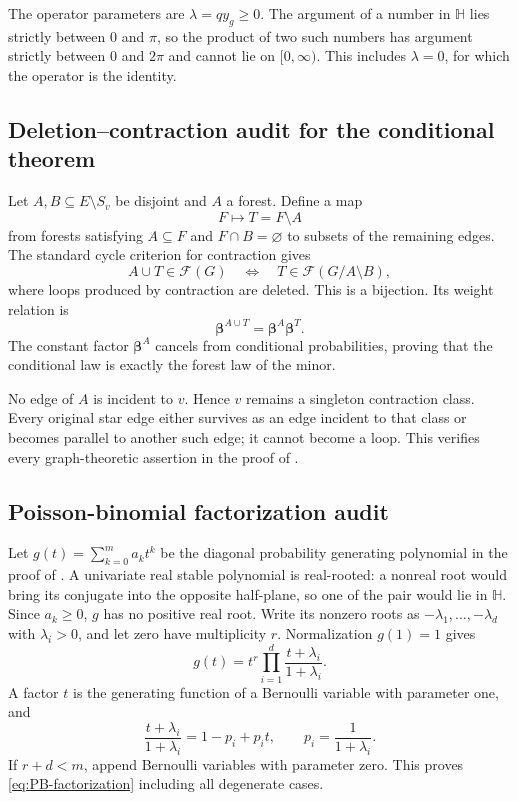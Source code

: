 \documentclass[11pt]{article}
\numberwithin{equation}{section}
\newcommand{\cF}{\mathcal F}
\newcommand{\Hh}{\mathbb H}
\newcommand{\betab}{\bm\beta}
\begin{document}
The operator parameters are $\lambda=qy_g\geq0$.  The argument of a number in $\Hh$ lies strictly between $0$ and $\pi$, so the product of two such numbers has argument strictly between $0$ and $2\pi$ and cannot lie on $[0,\infty)$.  This includes $\lambda=0$, for which the operator is the identity.

\subsection{Deletion--contraction audit for the conditional theorem}\label{app:minor-audit}

Let $A,B\subseteq E\setminus S_v$ be disjoint and $A$ a forest.  Define a map
\[
 F\longmapsto T=F\setminus A
\]
from forests satisfying $A\subseteq F$ and $F\cap B=\varnothing$ to subsets of the remaining edges.  The standard cycle criterion for contraction gives
\begin{equation}\label{eq:minor-equivalence}
 A\cup T\in\cF(G)
 \quad\Longleftrightarrow\quad
 T\in\cF(G/A\setminus B),
\end{equation}
where loops produced by contraction are deleted.  This is a bijection.  Its weight relation is
\[
 \betab^{A\cup T}=\betab^A\betab^T.
\]
The constant factor $\betab^A$ cancels from conditional probabilities, proving that the conditional law is exactly the forest law of the minor.

No edge of $A$ is incident to $v$.  Hence $v$ remains a singleton contraction class.  Every original star edge either survives as an edge incident to that class or becomes parallel to another such edge; it cannot become a loop.  This verifies every graph-theoretic assertion in the proof of .

\subsection{Poisson-binomial factorization audit}\label{app:PB-audit}

Let $g(t)=\sum_{k=0}^m a_kt^k$ be the diagonal probability generating polynomial in the proof of .  A univariate real stable polynomial is real-rooted: a nonreal root would bring its conjugate into the opposite half-plane, so one of the pair would lie in $\Hh$.  Since $a_k\geq0$, $g$ has no positive real root.  Write its nonzero roots as $-\lambda_1,\dots,-\lambda_d$ with $\lambda_i>0$, and let zero have multiplicity $r$.  Normalization $g(1)=1$ gives
\[
 g(t)=t^r\prod_{i=1}^{d}\frac{t+\lambda_i}{1+\lambda_i}.
\]
A factor $t$ is the generating function of a Bernoulli variable with parameter one, and
\[
 \frac{t+\lambda_i}{1+\lambda_i}
 =1-p_i+p_it,
 \qquad p_i=\frac{1}{1+\lambda_i}.
\]
If $r+d<m$, append Bernoulli variables with parameter zero.  This proves \eqref{eq:PB-factorization} including all degenerate cases.
\end{document}
